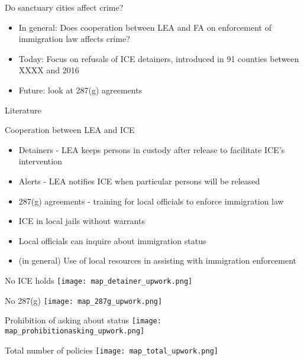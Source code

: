 \documentclass[xcolor=pdftex,dvipsnames,table]{beamer}
\begin{document}
\begin{frame}{ Do sanctuary cities affect crime?}
\begin{itemize}
\item In general: Does cooperation between LEA and FA on enforcement of immigration law affects crime?
\item Today: Focus on refusals of ICE detainers, introduced in 91 counties between XXXX and 2016
\item Future: look at 287(g) agreements
\end{itemize}
\end{frame}

\begin{frame}{Literature}
\end{frame}

\begin{frame}{Cooperation between LEA and ICE}
\begin{itemize}
\item Detainers - LEA keeps persons in custody after release to facilitate ICE's intervention
\item Alerts - LEA notifies ICE when particular persons will be released
\item 287(g) agreements - training for local officials to enforce immigration law
\item ICE in local jails without warrants
\item Local officials can inquire about immigration status
\item (in general) Use of local resources in assisting with immigration enforcement
\end{itemize}
\end{frame}


\begin{frame}{No ICE holds}
\texttt{[image: map\_detainer\_upwork.png]}
\end{frame}

\begin{frame}{No 287(g)}
\texttt{[image: map\_287g\_upwork.png]}
\end{frame}

\begin{frame}{Prohibition of asking about status}
\texttt{[image: map\_prohibitionasking\_upwork.png]}
\end{frame}

\begin{frame}{Total number of policies}
\texttt{[image: map\_total\_upwork.png]}
\end{frame}
\end{document}
